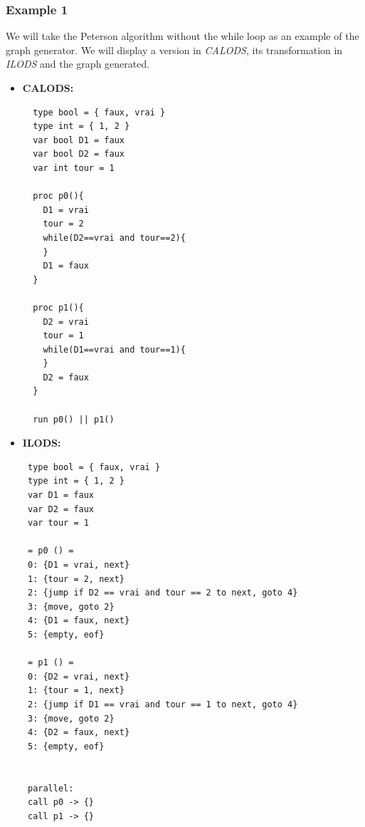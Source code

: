\documentclass{article}
\begin{document}
\subsubsection{Example 1}
We will take the Peterson algorithm without the while loop as an example of the graph generator. We will display a version in \textit{CALODS}, its transformation in \textit{ILODS} and the graph generated.
\begin{itemize}
  \item \textbf{CALODS:}
  \begin{lstlisting}
  type bool = { faux, vrai }
  type int = { 1, 2 }
  var bool D1 = faux
  var bool D2 = faux
  var int tour = 1

  proc p0(){
    D1 = vrai
    tour = 2
    while(D2==vrai and tour==2){
    }
    D1 = faux
  }

  proc p1(){
    D2 = vrai
    tour = 1
    while(D1==vrai and tour==1){
    }
    D2 = faux
  }

  run p0() || p1()
  \end{lstlisting}


  \item \textbf{ILODS:}
  \begin{lstlisting}
 type bool = { faux, vrai }
 type int = { 1, 2 }
 var D1 = faux
 var D2 = faux
 var tour = 1

 = p0 () =
 0: {D1 = vrai, next}
 1: {tour = 2, next}
 2: {jump if D2 == vrai and tour == 2 to next, goto 4}
 3: {move, goto 2}
 4: {D1 = faux, next}
 5: {empty, eof}
 
 = p1 () =
 0: {D2 = vrai, next}
 1: {tour = 1, next}
 2: {jump if D1 == vrai and tour == 1 to next, goto 4}
 3: {move, goto 2}
 4: {D2 = faux, next}
 5: {empty, eof}
 

 parallel:
 call p0 -> {}
 call p1 -> {}
  \end{lstlisting}


\end{itemize}
\end{document}
